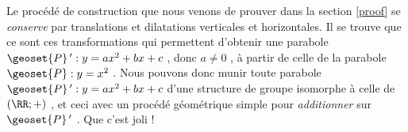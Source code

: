 Le procédé de construction que nous venons de prouver dans la section \ref{proof} se \emph{\og conserve \fg} par translations et dilatations verticales et horizontales.
Il se trouve que ce sont ces transformations qui permettent d'obtenir une parabole $\geoset{P}\,^\prime : y = a x^2 + b x + c$ , donc $a \neq 0$ , à partir de celle de la parabole $\geoset{P} : y = x^2$ .
Nous pouvons donc munir toute parabole $\geoset{P}\,^\prime : y = a x^2 + b x + c$ d'une structure de groupe isomorphe à celle de $(\RR ; +)$ , et ceci avec un procédé géométrique simple pour \emph{\og additionner \fg} sur $\geoset{P}\,^\prime$ . Que c'est joli !
